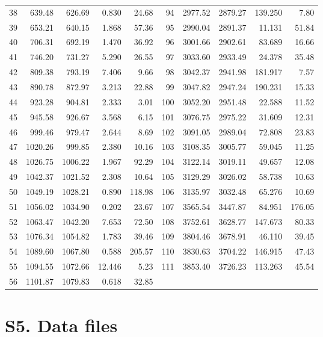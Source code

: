 \documentclass[11pt,a4paper]{article}
\begin{document}
\begin{longtable}{rrrrr@{\hskip 1.6em}rrrrr}
38 & 639.48 & 626.69 & 0.830 & 24.68 & 94 & 2977.52 & 2879.27 & 139.250 & 7.80 \\
39 & 653.21 & 640.15 & 1.868 & 57.36 & 95 & 2990.04 & 2891.37 & 11.131 & 51.84 \\
40 & 706.31 & 692.19 & 1.470 & 36.92 & 96 & 3001.66 & 2902.61 & 83.689 & 16.66 \\
41 & 746.20 & 731.27 & 5.290 & 26.55 & 97 & 3033.60 & 2933.49 & 24.378 & 35.48 \\
42 & 809.38 & 793.19 & 7.406 & 9.66 & 98 & 3042.37 & 2941.98 & 181.917 & 7.57 \\
43 & 890.78 & 872.97 & 3.213 & 22.88 & 99 & 3047.82 & 2947.24 & 190.231 & 15.33 \\
44 & 923.28 & 904.81 & 2.333 & 3.01 & 100 & 3052.20 & 2951.48 & 22.588 & 11.52 \\
45 & 945.58 & 926.67 & 3.568 & 6.15 & 101 & 3076.75 & 2975.22 & 31.609 & 12.31 \\
46 & 999.46 & 979.47 & 2.644 & 8.69 & 102 & 3091.05 & 2989.04 & 72.808 & 23.83 \\
47 & 1020.26 & 999.85 & 2.380 & 10.16 & 103 & 3108.35 & 3005.77 & 59.045 & 11.25 \\
48 & 1026.75 & 1006.22 & 1.967 & 92.29 & 104 & 3122.14 & 3019.11 & 49.657 & 12.08 \\
49 & 1042.37 & 1021.52 & 2.308 & 10.64 & 105 & 3129.29 & 3026.02 & 58.738 & 10.63 \\
50 & 1049.19 & 1028.21 & 0.890 & 118.98 & 106 & 3135.97 & 3032.48 & 65.276 & 10.69 \\
51 & 1056.02 & 1034.90 & 0.202 & 23.67 & 107 & 3565.54 & 3447.87 & 84.951 & 176.05 \\
52 & 1063.47 & 1042.20 & 7.653 & 72.50 & 108 & 3752.61 & 3628.77 & 147.673 & 80.33 \\
53 & 1076.34 & 1054.82 & 1.783 & 39.46 & 109 & 3804.46 & 3678.91 & 46.110 & 39.45 \\
54 & 1089.60 & 1067.80 & 0.588 & 205.57 & 110 & 3830.63 & 3704.22 & 146.915 & 47.43 \\
55 & 1094.55 & 1072.66 & 12.446 & 5.23 & 111 & 3853.40 & 3726.23 & 113.263 & 45.54 \\
56 & 1101.87 & 1079.83 & 0.618 & 32.85 &  & & & & \\
\end{longtable}

\section*{S5. Data files}
\end{document}
